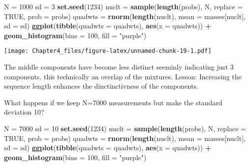 \documentclass[]{article}
\newenvironment{Shaded}{\begin{snugshade}}{\end{snugshade}}
\newcommand{\DataTypeTok}[1]{\textcolor[rgb]{0.13,0.29,0.53}{#1}}
\newcommand{\DecValTok}[1]{\textcolor[rgb]{0.00,0.00,0.81}{#1}}
\newcommand{\KeywordTok}[1]{\textcolor[rgb]{0.13,0.29,0.53}{\textbf{#1}}}
\newcommand{\NormalTok}[1]{#1}
\newcommand{\OperatorTok}[1]{\textcolor[rgb]{0.81,0.36,0.00}{\textbf{#1}}}
\newcommand{\OtherTok}[1]{\textcolor[rgb]{0.56,0.35,0.01}{#1}}
\newcommand{\StringTok}[1]{\textcolor[rgb]{0.31,0.60,0.02}{#1}}
\begin{document}
\begin{Shaded}
\begin{Highlighting}[]
\NormalTok{N  =}\StringTok{ }\DecValTok{1000}
\NormalTok{sd =}\StringTok{ }\DecValTok{3}
\KeywordTok{set.seed}\NormalTok{(}\DecValTok{1234}\NormalTok{)}
\NormalTok{nuclt   =}\StringTok{ }\KeywordTok{sample}\NormalTok{(}\KeywordTok{length}\NormalTok{(probs), N, }\DataTypeTok{replace =} \OtherTok{TRUE}\NormalTok{, }\DataTypeTok{prob =}\NormalTok{ probs)}
\NormalTok{quadwts =}\StringTok{ }\KeywordTok{rnorm}\NormalTok{(}\KeywordTok{length}\NormalTok{(nuclt),}
                \DataTypeTok{mean =}\NormalTok{ masses[nuclt],}
                \DataTypeTok{sd   =}\NormalTok{ sd)}
\KeywordTok{ggplot}\NormalTok{(}\KeywordTok{tibble}\NormalTok{(}\DataTypeTok{quadwts =}\NormalTok{ quadwts), }\KeywordTok{aes}\NormalTok{(}\DataTypeTok{x =}\NormalTok{ quadwts)) }\OperatorTok{+}
\StringTok{  }\KeywordTok{geom_histogram}\NormalTok{(}\DataTypeTok{bins =} \DecValTok{100}\NormalTok{, }\DataTypeTok{fill =} \StringTok{"purple"}\NormalTok{)}
\end{Highlighting}
\end{Shaded}

\texttt{[image: Chapter4\_files/figure-latex/unnamed-chunk-19-1.pdf]}

The middle components have become less distinct seeminly indicating just
3 components. this technically an overlap of the mixtures. Lesson:
Increasing the sequence length enhances the dinctinctivness of the
components.

What happens if we keep N=7000 measurements but make the standard
deviation 10?

\begin{Shaded}
\begin{Highlighting}[]
\NormalTok{N  =}\StringTok{ }\DecValTok{7000}
\NormalTok{sd =}\StringTok{ }\DecValTok{10}
\KeywordTok{set.seed}\NormalTok{(}\DecValTok{1234}\NormalTok{)}
\NormalTok{nuclt   =}\StringTok{ }\KeywordTok{sample}\NormalTok{(}\KeywordTok{length}\NormalTok{(probs), N, }\DataTypeTok{replace =} \OtherTok{TRUE}\NormalTok{, }\DataTypeTok{prob =}\NormalTok{ probs)}
\NormalTok{quadwts =}\StringTok{ }\KeywordTok{rnorm}\NormalTok{(}\KeywordTok{length}\NormalTok{(nuclt),}
                \DataTypeTok{mean =}\NormalTok{ masses[nuclt],}
                \DataTypeTok{sd   =}\NormalTok{ sd)}
\KeywordTok{ggplot}\NormalTok{(}\KeywordTok{tibble}\NormalTok{(}\DataTypeTok{quadwts =}\NormalTok{ quadwts), }\KeywordTok{aes}\NormalTok{(}\DataTypeTok{x =}\NormalTok{ quadwts)) }\OperatorTok{+}
\StringTok{  }\KeywordTok{geom_histogram}\NormalTok{(}\DataTypeTok{bins =} \DecValTok{100}\NormalTok{, }\DataTypeTok{fill =} \StringTok{"purple"}\NormalTok{)}
\end{Highlighting}
\end{Shaded}
\end{document}

